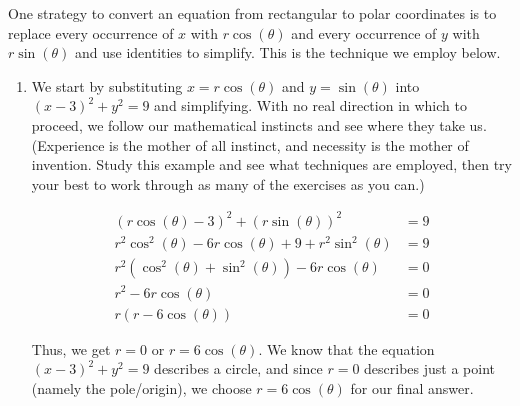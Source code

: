 {
One strategy to convert an equation from rectangular to polar coordinates is to replace every occurrence of $x$ with $r\cos(\theta)$ and every occurrence of $y$ with $r\sin(\theta)$ and use identities to simplify.  This is the technique we employ below.

\begin{enumerate}

\item We start by substituting  $x = r\cos(\theta)$ and $y = \sin(\theta)$ into $(x-3)^2 + y^2 = 9$ and simplifying.  With no real direction in which to proceed, we follow our mathematical instincts and see where they take us. (Experience is the mother of all instinct, and necessity is the mother of invention.  Study this example and see what techniques are employed, then try your best to work through as many of the exercises as you can.)

\noindent\hskip-10pt\begin{minipage}{\textwidth-35pt}
\begin{align*}
(r\cos(\theta) - 3)^2+ (r\sin(\theta))^2 & =9\\
r^2\cos^2(\theta) - 6 r\cos(\theta) + 9 + r^2 \sin^{2}(\theta) & =9\\
r^2\left(\cos^2(\theta) + \sin^{2}(\theta)\right) - 6 r\cos(\theta) & =0 \\
r^2 - 6 r\cos(\theta)& =0 \tag*{($\cos^2(\theta) + \sin^2(\theta) = 1$)} \\
r(r - 6 \cos(\theta))& =0 \tag*{Factor}
\end{align*}
\end{minipage}

\medskip

Thus, we get $r = 0$ or $r = 6\cos(\theta)$.  We know that the equation $(x-3)^2 + y^2 = 9$ describes a circle, and since $r=0$ describes just a point (namely the pole/origin), we choose $r = 6\cos(\theta)$ for our final answer. 



\end{enumerate}}
